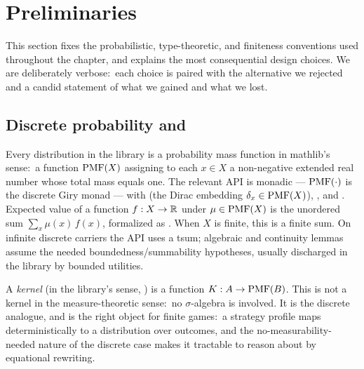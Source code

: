 \section{Preliminaries}
\label{sec:preliminaries}

This section fixes the probabilistic, type-theoretic, and
finiteness conventions used throughout the chapter, and explains
the most consequential design choices.  We are deliberately
verbose:\ each choice is paired with the alternative we rejected
and a candid statement of what we gained and what we lost.

\subsection{Discrete probability and }
\label{sec:prelim:pmf}

Every distribution in the library is a probability mass function
in mathlib's sense:\ a function $\mathrm{PMF}(X)$ assigning to each $x \in
X$ a non-negative extended real number whose total mass equals
one.  The relevant API is monadic — $\mathrm{PMF}(\cdot)$ is the discrete
Giry monad — with  (the Dirac embedding
$\delta_x \in \mathrm{PMF}(X)$), , and .  Expected value of
a function $f : X \to \mathbb{R}$ under $\mu \in \mathrm{PMF}(X)$ is the unordered
sum $\sum_x \mu(x)\,f(x)$, formalized as
.  When $X$ is finite, this is a
finite sum.  On infinite discrete carriers the API uses a tsum;
algebraic and continuity lemmas assume the needed
boundedness/summability hypotheses, usually discharged in the
library by bounded utilities.

A \emph{kernel} (in the library's sense, )
is a function $K : A \to \mathrm{PMF}(B)$.  This is not a kernel in the
measure-theoretic sense:\ no $\sigma$-algebra is involved.  It is the
discrete analogue, and is the right object for finite games:\ a
strategy profile maps deterministically to a distribution over
outcomes, and the no-measurability-needed nature of the discrete
case makes it tractable to reason about by equational rewriting.

